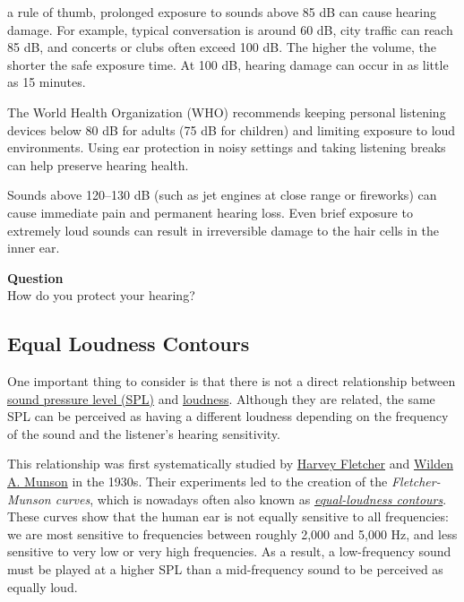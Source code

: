 \documentclass{article}
\begin{document}
\bigskipAs a rule of thumb, prolonged exposure to sounds above 85 dB can cause hearing damage. For example, typical conversation is around 60 dB, city traffic can reach 85 dB, and concerts or clubs often exceed 100 dB. The higher the volume, the shorter the safe exposure time. At 100 dB, hearing damage can occur in as little as 15 minutes.

The World Health Organization (WHO) recommends keeping personal listening devices below 80 dB for adults (75 dB for children) and limiting exposure to loud environments. Using ear protection in noisy settings and taking listening breaks can help preserve hearing health.

Sounds above 120--130 dB (such as jet engines at close range or fireworks) can cause immediate pain and permanent hearing loss. Even brief exposure to extremely loud sounds can result in irreversible damage to the hair cells in the inner ear.

\begin{framed}
\textbf{Question}\\
How do you protect your hearing?
\end{framed}

\subsection{Equal Loudness Contours}

One important thing to consider is that there is not a direct relationship between \href{https://en.wikipedia.org/wiki/Sound\_pressure\#Sound\_pressure\_level}{sound pressure level (SPL)} and \href{https://en.wikipedia.org/wiki/Loudness}{loudness}. Although they are related, the same SPL can be perceived as having a different loudness depending on the frequency of the sound and the listener's hearing sensitivity.

This relationship was first systematically studied by \href{https://en.wikipedia.org/wiki/Harvey\_Fletcher}{Harvey Fletcher} and \href{https://en.wikipedia.org/wiki/Wilden\_A.\_Munson}{Wilden A. Munson} in the 1930s. Their experiments led to the creation of the \textit{Fletcher-Munson curves}, which is nowadays often also known as \textit{\href{https://en.wikipedia.org/wiki/Equal-loudness\_contour}{equal-loudness contours}}. These curves show that the human ear is not equally sensitive to all frequencies: we are most sensitive to frequencies between roughly 2,000 and 5,000 Hz, and less sensitive to very low or very high frequencies. As a result, a low-frequency sound must be played at a higher SPL than a mid-frequency sound to be perceived as equally loud.
\end{document}
